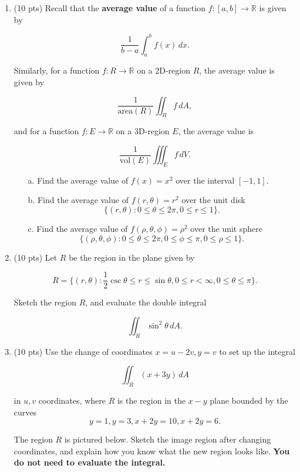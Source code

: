 \documentclass[12 pt]{report}
\begin{document}
\newpage
\begin{enumerate}

\item (10 pts) Recall that the \textbf{average value} of a function $f:[a,b] \to \mathbb{R}$ is given by

$$\frac{1}{b-a} \int_a^b f(x) \, dx.$$

Similarly, for a function $f:R \to \mathbb{R}$ on a 2D-region $R$, the average value is given by

$$\frac{1}{\text{area}(R)} \iint_R f \, dA,$$

and for a function $f:E \to \mathbb{R}$ on a 3D-region $E$, the average value is

$$\frac{1}{\text{vol}(E)} \iiint_E f \, dV.$$

\begin{enumerate} \item[a.] Find the average value of $f(x) = x^2$ over the interval $[-1,1]$. 

\item[b.] Find the average value of $f(r,\theta) = r^2$ over the unit disk 
$$\{(r,\theta): 0 \leq \theta \leq 2\pi, 0 \leq r \leq 1\}.$$ 

\item[c.] Find the average value of $f(\rho, \theta, \phi) = \rho^2$ over the unit sphere 
$$\{(\rho, \theta, \phi): 0 \leq \theta \leq 2\pi, 0 \leq \phi \leq \pi, 0 \leq \rho \leq 1\}.$$ 

\end{enumerate} \vfill

\newpage

\item (10 pts) Let $R$ be the region in the plane given by 

$$R = \{(r, \theta): \frac{1}{2} \csc \theta \leq r \leq \sin \theta, 0 \leq r < \infty, 0 \leq \theta \leq \pi\}.$$

Sketch the region $R$, and evaluate the double integral 

$$\iint_R \sin^2\theta \, dA.$$ 

\newpage

\item (10 pts) Use the change of coordinates $x = u-2v, y = v$ to set up the integral 

$$\iint_R (x+3y) \, dA$$

in $u,v$ coordinates, where $R$ is the region in the $x-y$ plane bounded by the curves 
$$y=1, y=3, x+2y=10, x+2y=6.$$

The region $R$ is pictured below. Sketch the image region after changing coordinates, and explain how you know what the new region looks like. \textbf{You do not need to evaluate the integral.}


\end{enumerate}
\end{document}
